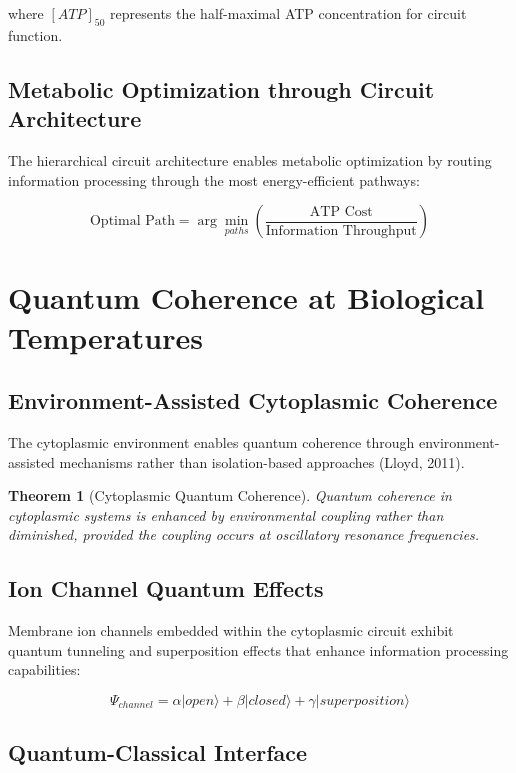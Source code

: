 \documentclass[12pt,a4paper]{article}
\newtheorem{theorem}{Theorem}
\begin{document}
where $[ATP]_{50}$ represents the half-maximal ATP concentration for circuit function.

\subsection{Metabolic Optimization through Circuit Architecture}

The hierarchical circuit architecture enables metabolic optimization by routing information processing through the most energy-efficient pathways:

\begin{equation}
\text{Optimal Path} = \arg\min_{paths} \left(\frac{\text{ATP Cost}}{\text{Information Throughput}}\right)
\end{equation}

\section{Quantum Coherence at Biological Temperatures}

\subsection{Environment-Assisted Cytoplasmic Coherence}

The cytoplasmic environment enables quantum coherence through environment-assisted mechanisms rather than isolation-based approaches (Lloyd, 2011).

\begin{theorem}[Cytoplasmic Quantum Coherence]
Quantum coherence in cytoplasmic systems is enhanced by environmental coupling rather than diminished, provided the coupling occurs at oscillatory resonance frequencies.
\end{theorem}

\subsection{Ion Channel Quantum Effects}

Membrane ion channels embedded within the cytoplasmic circuit exhibit quantum tunneling and superposition effects that enhance information processing capabilities:

\begin{equation}
\Psi_{channel} = \alpha|open\rangle + \beta|closed\rangle + \gamma|superposition\rangle
\end{equation}

\subsection{Quantum-Classical Interface}
\end{document}
